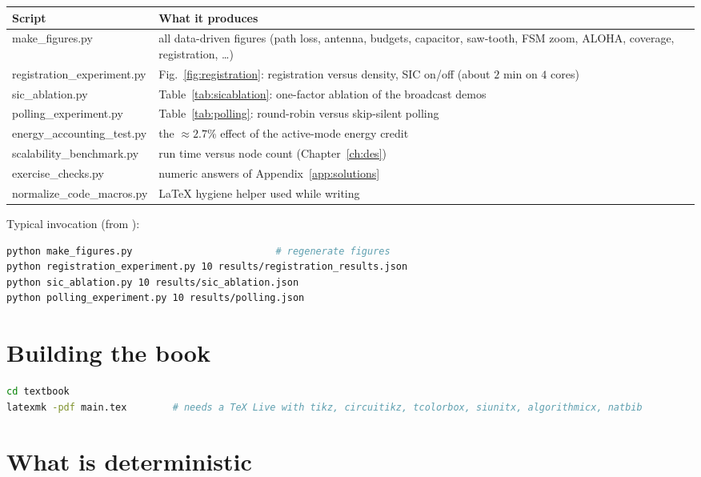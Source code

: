 \begin{center}
\small
\renewcommand{\arraystretch}{1.15}
\begin{tabularx}{\linewidth}{@{}>{\ttfamily}p{5.6cm}X@{}}
\toprule
\normalfont\bfseries Script & \normalfont\bfseries What it produces\\
\midrule
make\_figures.py & all data-driven figures (path loss, antenna, budgets, capacitor, saw-tooth, FSM zoom, ALOHA, coverage, registration, \dots)\\
registration\_experiment.py & Fig.~\ref{fig:registration}: registration versus density, SIC on/off (about $2$ min on $4$ cores)\\
sic\_ablation.py & Table~\ref{tab:sicablation}: one-factor ablation of the broadcast demos\\
polling\_experiment.py & Table~\ref{tab:polling}: round-robin versus skip-silent polling\\
energy\_accounting\_test.py & the $\approx2.7\%$ effect of the active-mode energy credit\\
scalability\_benchmark.py & run time versus node count (Chapter~\ref{ch:des})\\
exercise\_checks.py & numeric answers of Appendix~\ref{app:solutions}\\
normalize\_code\_macros.py & LaTeX hygiene helper used while writing\\
\bottomrule
\end{tabularx}
\end{center}
Typical invocation (from ):
\begin{lstlisting}[language=bash]
python make_figures.py                         # regenerate figures
python registration_experiment.py 10 results/registration_results.json
python sic_ablation.py 10 results/sic_ablation.json
python polling_experiment.py 10 results/polling.json
\end{lstlisting}

\section{Building the book}
\begin{lstlisting}[language=bash]
cd textbook
latexmk -pdf main.tex        # needs a TeX Live with tikz, circuitikz, tcolorbox, siunitx, algorithmicx, natbib
\end{lstlisting}

\section{What is deterministic}

